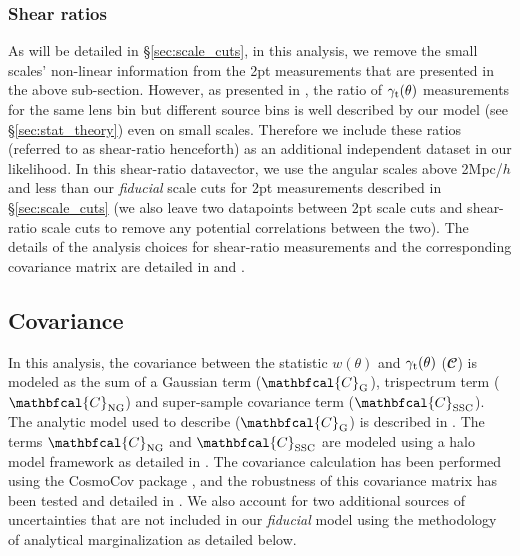 \documentclass[aps, prd,twocolumn,superscriptaddress,nofootinbib,preprintnumbers]{revtex4-1}
\newcommand{\gammat}{\ensuremath{\gamma_{\rm t}(\theta)}}
\newcommand{\wtheta}{\ensuremath{w(\theta)}}
\newcommand{\SP}[1]{{\color{orange}[SP: #1]}}
\begin{document}
\subsubsection{Shear ratios}\label{sec:shear_ratio}
As will be detailed in \S\ref{sec:scale_cuts}, in this analysis, we remove the small scales' non-linear information from the 2pt measurements that are presented in the above sub-section. However, as presented in \citet*{y3-shearratio}, the ratio of $\gammat$ measurements for the same lens bin but different source bins is well described by our model (see \S\ref{sec:stat_theory}) even on small scales. Therefore we include these ratios (referred to as shear-ratio henceforth) as an additional independent dataset in our likelihood. In this shear-ratio datavector, we use the angular scales above 2Mpc/$h$ and less than our \textit{fiducial} scale cuts for 2pt measurements described in \S\ref{sec:scale_cuts} (we also leave two datapoints between 2pt scale cuts and shear-ratio scale cuts to remove any potential correlations between the two). The details of the analysis choices for shear-ratio measurements and the corresponding covariance matrix are detailed in \citet*{y3-shearratio} and \citet*{y3-3x2ptkp}. 





\subsection{Covariance}
\label{sec:cov}

In this analysis, the covariance between the statistic $\wtheta$ and $\gammat$ (${\mathbfcal{C}}$) is modeled as the sum of a Gaussian term ($\mathbfcal{C}_{\rm G}$), trispectrum term ($\mathbfcal{C}_{\rm NG}$) and super-sample covariance term ($\mathbfcal{C}_{\rm SSC}$). The analytic model used to describe ($\mathbfcal{C}_{\rm G}$) is described in \cite{y3-covariances}. The terms $\mathbfcal{C}_{\rm NG}$ and $\mathbfcal{C}_{\rm SSC}$ are modeled using a halo model framework as detailed in \cite{Krause:2016jvl, Krause2017}. The covariance calculation has been performed using the CosmoCov package \citep{Fang:2020vhc}, and the robustness of this covariance matrix has been tested and detailed in \cite{y3-covariances}. We also account for two additional sources of uncertainties that are not included in our \textit{fiducial} model using the methodology of analytical marginalization \citep{Bridle_2002} as detailed below. 
\end{document}
